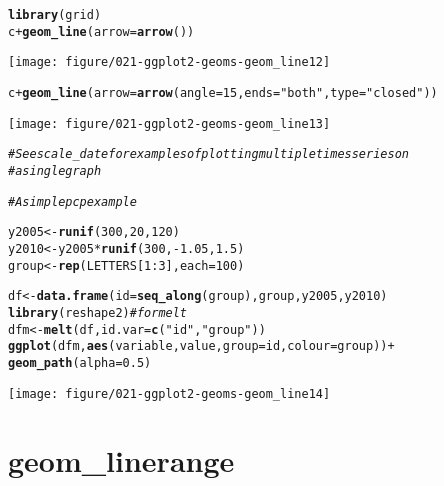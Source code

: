 \documentclass[a4paper,titlepage]{tufte-handout}\usepackage[]{graphicx}\usepackage[]{color}
\makeatletter
\def\maxwidth{ %
  \ifdim\Gin@nat@width>\linewidth
    \linewidth
  \else
    \Gin@nat@width
  \fi
}
\newcommand{\hlnum}[1]{\textcolor[rgb]{0.686,0.059,0.569}{#1}}%
\newcommand{\hlstr}[1]{\textcolor[rgb]{0.192,0.494,0.8}{#1}}%
\newcommand{\hlcom}[1]{\textcolor[rgb]{0.678,0.584,0.686}{\textit{#1}}}%
\newcommand{\hlopt}[1]{\textcolor[rgb]{0,0,0}{#1}}%
\newcommand{\hlstd}[1]{\textcolor[rgb]{0.345,0.345,0.345}{#1}}%
\newcommand{\hlkwb}[1]{\textcolor[rgb]{0.69,0.353,0.396}{#1}}%
\newcommand{\hlkwc}[1]{\textcolor[rgb]{0.333,0.667,0.333}{#1}}%
\newcommand{\hlkwd}[1]{\textcolor[rgb]{0.737,0.353,0.396}{\textbf{#1}}}%
\newenvironment{kframe}{%
 \def\at@end@of@kframe{}%
 \ifinner\ifhmode%
  \def\at@end@of@kframe{\end{minipage}}%
  \begin{minipage}{\columnwidth}%
 \fi\fi%
 \def\FrameCommand##1{\hskip\@totalleftmargin \hskip-\fboxsep
 \colorbox{shadecolor}{##1}\hskip-\fboxsep
     \hskip-\linewidth \hskip-\@totalleftmargin \hskip\columnwidth}%
 \MakeFramed {\advance\hsize-\width
   \@totalleftmargin\z@ \linewidth\hsize
   \@setminipage}}%
 {\par\unskip\endMakeFramed%
 \at@end@of@kframe}
\newenvironment{knitrout}{}{} %
\makeatother
\begin{document}
\begin{knitrout}
\begin{kframe}
\begin{alltt}
\hlkwd{library}\hlstd{(grid)}
\hlstd{c} \hlopt{+} \hlkwd{geom_line}\hlstd{(}\hlkwc{arrow} \hlstd{=} \hlkwd{arrow}\hlstd{())}
\end{alltt}
\end{kframe}
\texttt{[image: figure/021-ggplot2-geoms-geom\_line12]} 
\begin{kframe}\begin{alltt}
\hlstd{c} \hlopt{+} \hlkwd{geom_line}\hlstd{(}\hlkwc{arrow} \hlstd{=} \hlkwd{arrow}\hlstd{(}\hlkwc{angle} \hlstd{=} \hlnum{15}\hlstd{,} \hlkwc{ends} \hlstd{=} \hlstr{"both"}\hlstd{,} \hlkwc{type} \hlstd{=} \hlstr{"closed"}\hlstd{))}
\end{alltt}
\end{kframe}
\texttt{[image: figure/021-ggplot2-geoms-geom\_line13]} 
\begin{kframe}\begin{alltt}
\hlcom{# See scale_date for examples of plotting multiple times series on}
\hlcom{# a single graph}

\hlcom{# A simple pcp example}

\hlstd{y2005} \hlkwb{<-} \hlkwd{runif}\hlstd{(}\hlnum{300}\hlstd{,} \hlnum{20}\hlstd{,} \hlnum{120}\hlstd{)}
\hlstd{y2010} \hlkwb{<-} \hlstd{y2005} \hlopt{*} \hlkwd{runif}\hlstd{(}\hlnum{300}\hlstd{,} \hlopt{-}\hlnum{1.05}\hlstd{,} \hlnum{1.5}\hlstd{)}
\hlstd{group} \hlkwb{<-} \hlkwd{rep}\hlstd{(LETTERS[}\hlnum{1}\hlopt{:}\hlnum{3}\hlstd{],} \hlkwc{each} \hlstd{=} \hlnum{100}\hlstd{)}

\hlstd{df} \hlkwb{<-} \hlkwd{data.frame}\hlstd{(}\hlkwc{id} \hlstd{=} \hlkwd{seq_along}\hlstd{(group), group, y2005, y2010)}
\hlkwd{library}\hlstd{(reshape2)} \hlcom{# for melt}
\hlstd{dfm} \hlkwb{<-} \hlkwd{melt}\hlstd{(df,} \hlkwc{id.var} \hlstd{=} \hlkwd{c}\hlstd{(}\hlstr{"id"}\hlstd{,} \hlstr{"group"}\hlstd{))}
\hlkwd{ggplot}\hlstd{(dfm,} \hlkwd{aes}\hlstd{(variable, value,} \hlkwc{group} \hlstd{= id,} \hlkwc{colour} \hlstd{= group))} \hlopt{+}
  \hlkwd{geom_path}\hlstd{(}\hlkwc{alpha} \hlstd{=} \hlnum{0.5}\hlstd{)}
\end{alltt}
\end{kframe}
\texttt{[image: figure/021-ggplot2-geoms-geom\_line14]} 

\end{knitrout}



\section{geom\_linerange}
\end{document}
